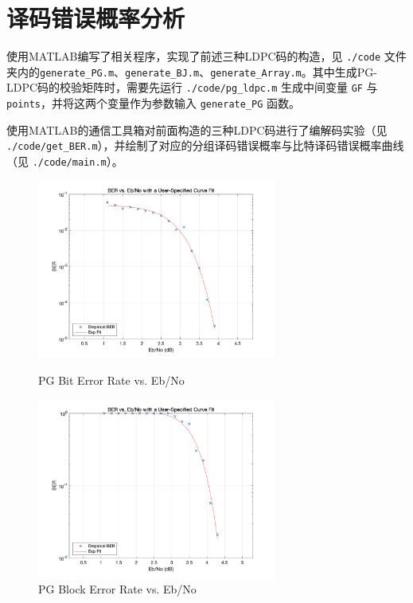\documentclass[lang=cn,11pt,a4paper,numbers]{elegantpaper}
\begin{document}
\section{译码错误概率分析}

使用MATLAB编写了相关程序，实现了前述三种LDPC码的构造，见 \lstinline{./code} 文件夹内的\lstinline{generate_PG.m}、\lstinline{generate_BJ.m}、\lstinline{generate_Array.m}。其中生成PG-LDPC码的校验矩阵时，需要先运行 \lstinline{./code/pg_ldpc.m} 生成中间变量 \lstinline{GF} 与 \lstinline{points}，并将这两个变量作为参数输入 \lstinline{generate_PG} 函数。

使用MATLAB的通信工具箱对前面构造的三种LDPC码进行了编解码实验（见 \lstinline{./code/get_BER.m}），并绘制了对应的分组译码错误概率与比特译码错误概率曲线（见 \lstinline{./code/main.m}）。

\begin{figure}[htbp]
\begin{minipage}[t]{0.5\linewidth}
\centering
\includegraphics[width=3.1in]{figure/pg_bit_er.png}
\caption{PG Bit Error Rate vs. Eb/No}
\label{fig:pg_bit_er}
\end{minipage}%
\begin{minipage}[t]{0.5\linewidth}
\centering
\includegraphics[width=3.1in]{figure/pg_block_er.png}
\caption{PG Block Error Rate vs. Eb/No}
\label{fig:pg_block_er}
\end{minipage}
\end{figure}
\end{document}
